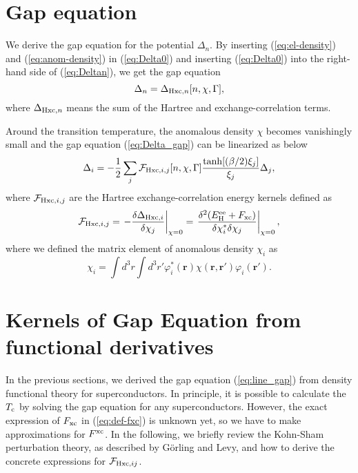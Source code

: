 \section{Gap equation}
%
We derive the gap equation for the potential $\Delta_n$. By inserting (\ref{eq:el-density}) 
and (\ref{eq:anom-density}) in (\ref{eq:Delta0}) and inserting (\ref{eq:Delta0}) into the 
right-hand side of (\ref{eq:Deltan}), we get the gap equation
%
\begin{equation}
	\Delta_n = \Delta_{{\rm Hxc}, n}[n, \chi, \Gamma],
	\label{eq:Delta_gap}
\end{equation}
%
where $\Delta_{{\rm Hxc},n}$ means the sum of the Hartree and exchange-correlation terms.

Around the transition temperature, the anomalous density $\chi$ becomes vanishingly small 
and the gap equation (\ref{eq:Delta_gap}) can be linearized as below
%
\begin{equation}
	\Delta_i = -\frac{1}{2}\sum_{j} {\mathcal F}_{{\rm Hxc}, i,j}[n, \chi, \Gamma]
	\frac{\tanh[(\beta/2)\xi_j]}{\xi_j}\Delta_j,
	\label{eq:line_gap}
\end{equation}
%
where ${\mathcal F}_{{\rm Hxc}, i,j}$ are the Hartree exchange-correlation energy kernels defined as
%
\begin{equation}
	{\mathcal F}_{{\rm Hxc},i,j} = \left. -\frac{\delta \Delta_{{\rm Hxc}, i}}{\delta \chi_j} 
	                               \right|_{\chi = 0}
				       = \left. \frac{\delta^2(E^{\rm ee}_{\rm H}+F_{\rm xc})}
				       {\delta \chi^{\ast}_i \delta \chi_j} \right|_{\chi = 0},
	\label{eq:def-fxc}
\end{equation}
%
where we defined the matrix element of anomalous density $\chi_i$ as
%
\begin{equation}
	\chi_i = \int d^3r\int d^3r' \varphi^{\ast}_i(\bm{r})\chi(\bm{r}, \bm{r'})\varphi_i(\bm{r'}).
	\label{eq:chi_i_def}
\end{equation}
%

\section{Kernels of Gap Equation from functional derivatives}

In the previous sections, we derived the gap equation (\ref{eq:line_gap}) from density functional
theory for superconductors. In principle, it is possible to calculate the $T_{\rm c}$ by solving 
the gap equation for any superconductors. However, the exact expression of $F_{\rm xc}$ in (\ref{eq:def-fxc})
is unknown yet, so we have to make approximations for $F^{\rm xc}$.
In the following, we briefly review the Kohn-Sham perturbation theory,
as described by G\"{o}rling and Levy\cite{Levy1994}, 
and how to derive the concrete expressions for ${\mathcal F}_{{\rm Hxc},ij}$.

